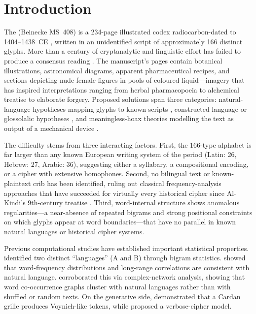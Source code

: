 
\section{Introduction}
\label{sec:intro}

The \vms{} (Beinecke MS~408) is a 234-page illustrated codex radiocarbon-dated to 1404--1438~CE \citep{hodgins2011}, written in an unidentified script of approximately 166 distinct glyphs.  More than a century of cryptanalytic and linguistic effort has failed to produce a consensus reading \citep{dimperio1978, clemens2016}.  The manuscript's pages contain botanical illustrations, astronomical diagrams, apparent pharmaceutical recipes, and sections depicting nude female figures in pools of coloured liquid---imagery that has inspired interpretations ranging from herbal pharmacopoeia to alchemical treatise to elaborate forgery.  Proposed solutions span three categories: natural-language hypotheses mapping glyphs to known scripts \citep{stolfi1997}, constructed-language or glossolalic hypotheses \citep{rugg2004}, and meaningless-hoax theories modelling the text as output of a mechanical device \citep{rugg2004, timm2020}.

The difficulty stems from three interacting factors.  First, the 166-type alphabet is far larger than any known European writing system of the period (Latin: 26, Hebrew: 27, Arabic: 36), suggesting either a syllabary, a compositional encoding, or a cipher with extensive homophones.  Second, no bilingual text or known-plaintext crib has been identified, ruling out classical frequency-analysis approaches that have succeeded for virtually every historical cipher since Al-Kindi's 9th-century treatise \citep{kahn1967}.  Third, word-internal structure shows anomalous regularities---a near-absence of repeated bigrams and strong positional constraints on which glyphs appear at word boundaries---that have no parallel in known natural languages or historical cipher systems.

Previous computational studies have established important statistical properties.  \citet{currier1976} identified two distinct ``languages'' (A and B) through bigram statistics.  \citet{montemurro2013} showed that word-frequency distributions and long-range correlations are consistent with natural language.  \citet{amancio2013} corroborated this via complex-network analysis, showing that word co-occurrence graphs cluster with natural languages rather than with shuffled or random texts.  On the generative side, \citet{rugg2004} demonstrated that a Cardan grille produces Voynich-like tokens, while \citet{timm2020} proposed a verbose-cipher model.

